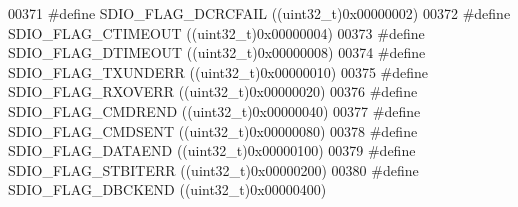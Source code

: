 \begin{DoxyCode}
00371 \textcolor{preprocessor}{#}\textcolor{preprocessor}{define} \textcolor{preprocessor}{SDIO\_FLAG\_DCRCFAIL}                  \textcolor{preprocessor}{(}\textcolor{preprocessor}{(}\textcolor{preprocessor}{uint32\_t}\textcolor{preprocessor}{)}0x00000002\textcolor{preprocessor}{)}
00372 \textcolor{preprocessor}{#}\textcolor{preprocessor}{define} \textcolor{preprocessor}{SDIO\_FLAG\_CTIMEOUT}                  \textcolor{preprocessor}{(}\textcolor{preprocessor}{(}\textcolor{preprocessor}{uint32\_t}\textcolor{preprocessor}{)}0x00000004\textcolor{preprocessor}{)}
00373 \textcolor{preprocessor}{#}\textcolor{preprocessor}{define} \textcolor{preprocessor}{SDIO\_FLAG\_DTIMEOUT}                  \textcolor{preprocessor}{(}\textcolor{preprocessor}{(}\textcolor{preprocessor}{uint32\_t}\textcolor{preprocessor}{)}0x00000008\textcolor{preprocessor}{)}
00374 \textcolor{preprocessor}{#}\textcolor{preprocessor}{define} \textcolor{preprocessor}{SDIO\_FLAG\_TXUNDERR}                  \textcolor{preprocessor}{(}\textcolor{preprocessor}{(}\textcolor{preprocessor}{uint32\_t}\textcolor{preprocessor}{)}0x00000010\textcolor{preprocessor}{)}
00375 \textcolor{preprocessor}{#}\textcolor{preprocessor}{define} \textcolor{preprocessor}{SDIO\_FLAG\_RXOVERR}                   \textcolor{preprocessor}{(}\textcolor{preprocessor}{(}\textcolor{preprocessor}{uint32\_t}\textcolor{preprocessor}{)}0x00000020\textcolor{preprocessor}{)}
00376 \textcolor{preprocessor}{#}\textcolor{preprocessor}{define} \textcolor{preprocessor}{SDIO\_FLAG\_CMDREND}                   \textcolor{preprocessor}{(}\textcolor{preprocessor}{(}\textcolor{preprocessor}{uint32\_t}\textcolor{preprocessor}{)}0x00000040\textcolor{preprocessor}{)}
00377 \textcolor{preprocessor}{#}\textcolor{preprocessor}{define} \textcolor{preprocessor}{SDIO\_FLAG\_CMDSENT}                   \textcolor{preprocessor}{(}\textcolor{preprocessor}{(}\textcolor{preprocessor}{uint32\_t}\textcolor{preprocessor}{)}0x00000080\textcolor{preprocessor}{)}
00378 \textcolor{preprocessor}{#}\textcolor{preprocessor}{define} \textcolor{preprocessor}{SDIO\_FLAG\_DATAEND}                   \textcolor{preprocessor}{(}\textcolor{preprocessor}{(}\textcolor{preprocessor}{uint32\_t}\textcolor{preprocessor}{)}0x00000100\textcolor{preprocessor}{)}
00379 \textcolor{preprocessor}{#}\textcolor{preprocessor}{define} \textcolor{preprocessor}{SDIO\_FLAG\_STBITERR}                  \textcolor{preprocessor}{(}\textcolor{preprocessor}{(}\textcolor{preprocessor}{uint32\_t}\textcolor{preprocessor}{)}0x00000200\textcolor{preprocessor}{)}
00380 \textcolor{preprocessor}{#}\textcolor{preprocessor}{define} \textcolor{preprocessor}{SDIO\_FLAG\_DBCKEND}                   \textcolor{preprocessor}{(}\textcolor{preprocessor}{(}\textcolor{preprocessor}{uint32\_t}\textcolor{preprocessor}{)}0x00000400\textcolor{preprocessor}{)}

\end{DoxyCode}
